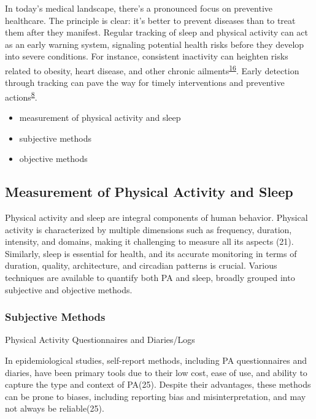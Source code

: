 \documentclass[
  9pt,
]{article}
\providecommand{\tightlist}{%
  \setlength{\itemsep}{0pt}\setlength{\parskip}{0pt}}\usepackage{longtable,booktabs,array}
\begin{document}
In today's medical landscape, there's a pronounced focus on preventive
healthcare. The principle is clear: it's better to prevent diseases than
to treat them after they manifest. Regular tracking of sleep and
physical activity can act as an early warning system, signaling
potential health risks before they develop into severe conditions. For
instance, consistent inactivity can heighten risks related to obesity,
heart disease, and other chronic
ailments\textsuperscript{\protect\hyperlink{ref-tremblay_sedentary_2017}{16}}.
Early detection through tracking can pave the way for timely
interventions and preventive
actions\textsuperscript{\protect\hyperlink{ref-liguori_evolving_2023}{8}}.

\begin{itemize}
\tightlist
\item
  measurement of physical activity and sleep
\item
  subjective methods
\item
  objective methods
\end{itemize}

\hypertarget{measurement-of-physical-activity-and-sleep}{%
\subsection{Measurement of Physical Activity and
Sleep}\label{measurement-of-physical-activity-and-sleep}}

Physical activity and sleep are integral components of human behavior.
Physical activity is characterized by multiple dimensions such as
frequency, duration, intensity, and domains, making it challenging to
measure all its aspects (21). Similarly, sleep is essential for health,
and its accurate monitoring in terms of duration, quality, architecture,
and circadian patterns is crucial. Various techniques are available to
quantify both PA and sleep, broadly grouped into subjective and
objective methods.

\hypertarget{subjective-methods}{%
\subsubsection{Subjective Methods}\label{subjective-methods}}

Physical Activity Questionnaires and Diaries/Logs

In epidemiological studies, self-report methods, including PA
questionnaires and diaries, have been primary tools due to their low
cost, ease of use, and ability to capture the type and context of
PA(25). Despite their advantages, these methods can be prone to biases,
including reporting bias and misinterpretation, and may not always be
reliable(25).
\end{document}
